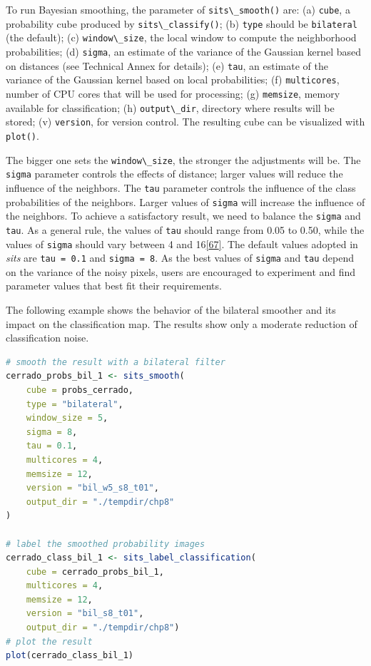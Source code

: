 \documentclass[
  11pt,
]{report}
\newcommand{\passthrough}[1]{#1}
\begin{document}
To run Bayesian smoothing, the parameter of
\passthrough{\lstinline!sits\_smooth()!} are: (a)
\passthrough{\lstinline!cube!}, a probability cube produced by
\passthrough{\lstinline!sits\_classify()!}; (b)
\passthrough{\lstinline!type!} should be
\passthrough{\lstinline!bilateral!} (the default); (c)
\passthrough{\lstinline!window\_size!}, the local window to compute the
neighborhood probabilities; (d) \passthrough{\lstinline!sigma!}, an
estimate of the variance of the Gaussian kernel based on distances (see
Technical Annex for details); (e) \passthrough{\lstinline!tau!}, an
estimate of the variance of the Gaussian kernel based on local
probabilities; (f) \passthrough{\lstinline!multicores!}, number of CPU
cores that will be used for processing; (g)
\passthrough{\lstinline!memsize!}, memory available for classification;
(h) \passthrough{\lstinline!output\_dir!}, directory where results will
be stored; (v) \passthrough{\lstinline!version!}, for version control.
The resulting cube can be visualized with
\passthrough{\lstinline!plot()!}.

The bigger one sets the \passthrough{\lstinline!window\_size!}, the
stronger the adjustments will be. The \passthrough{\lstinline!sigma!}
parameter controls the effects of distance; larger values will reduce
the influence of the neighbors. The \passthrough{\lstinline!tau!}
parameter controls the influence of the class probabilities of the
neighbors. Larger values of \passthrough{\lstinline!sigma!} will
increase the influence of the neighbors. To achieve a satisfactory
result, we need to balance the \passthrough{\lstinline!sigma!} and
\passthrough{\lstinline!tau!}. As a general rule, the values of
\passthrough{\lstinline!tau!} should range from 0.05 to 0.50, while the
values of \passthrough{\lstinline!sigma!} should vary between 4 and
16\protect\hyperlink{ref-Paris2007}{{[}67{]}}. The default values
adopted in \emph{sits} are \passthrough{\lstinline!tau = 0.1!} and
\passthrough{\lstinline!sigma = 8!}. As the best values of
\passthrough{\lstinline!sigma!} and \passthrough{\lstinline!tau!} depend
on the variance of the noisy pixels, users are encouraged to experiment
and find parameter values that best fit their requirements.

The following example shows the behavior of the bilateral smoother and
its impact on the classification map. The results show only a moderate
reduction of classification noise.

\begin{lstlisting}[language=R]
# smooth the result with a bilateral filter
cerrado_probs_bil_1 <- sits_smooth(
    cube = probs_cerrado, 
    type = "bilateral",
    window_size = 5,
    sigma = 8,
    tau = 0.1,
    multicores = 4,
    memsize = 12,
    version = "bil_w5_s8_t01",
    output_dir = "./tempdir/chp8"
)

# label the smoothed probability images
cerrado_class_bil_1 <- sits_label_classification(
    cube = cerrado_probs_bil_1,
    multicores = 4,
    memsize = 12,
    version = "bil_s8_t01",
    output_dir = "./tempdir/chp8")
# plot the result
plot(cerrado_class_bil_1)
\end{lstlisting}
\end{document}
